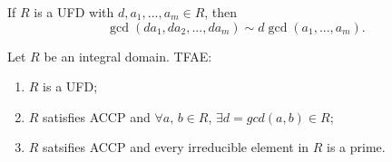 \begin{note}
  If $R$ is a UFD with $d, a_1, ..., a_m \in R$, then
  \begin{equation*}
    \gcd(da_1, da_2, ..., da_m) \sim d \gcd(a_1, ..., a_m).
  \end{equation*}
\end{note}

\begin{thm}
\label{thm:ufd_and_accp}
  Let $R$ be an integral domain. TFAE:
  \begin{enumerate}
    \item $R$ is a UFD;
    \item $R$ satisfies ACCP and $\forall a, \, b \in R$, $\exists d = gcd(a, b) \in R$;
    \item $R$ satsifies ACCP and every irreducible element in $R$ is a prime.
  \end{enumerate}
\end{thm}

